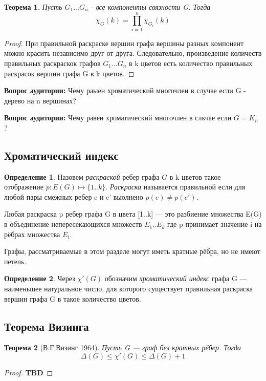 \documentclass{article}
\renewcommand{\le}{\leqslant}
\newtheorem{theorem}{Теорема}
\theoremstyle{definition}
\newtheorem{definition}{Определение}[section]
\newcommand{\question}{\textbf{Вопрос аудитории: }}
\theoremstyle{remark}
\begin{document}
\begin{theorem}
    Пусть $G_1...G_n$ - все компоненты связности G. Тогда 
    $$
    \chi_G(k) = \prod_{i = 1}^{n} \chi_{G_i}(k)
    $$
\end{theorem}
\begin{proof}
При правильной раскраске вершин графа вершины
разных компонент можно красить независимо друг от
друга. Следовательно, произведение количеств правильных
раскраскок графов $G_1...G_n$ в k цветов есть количество
правильных раскрасок вершин графа G в k цветов.
\end{proof}

\question Чему раыен хроматический многочлен в случае если  G - дерево на n вершинах?

\question Чему равен хроматический многочлен в слкчае если $G = K_n$ ? 

\subsection{Хроматический индекс}

\begin{definition}
    Назовем \textit{раскраской} ребер графа $G$ в k цветов такое отображение 
    $p: E(G) \mapsto \{1..k\}$. \textit{Раскраска} называется правильной если для любой пары смежных ребер e и e' выолнено $p(e) \not= p(e')$.
\end{definition}

Любая раскраска p ребер графа G в цвета [1..k] — это
разбиение множества E(G) в объединение
непересекающихся множеств $E_1..E_k$ где p принимает
значение i на рёбрах множества $E_i$.

Графы, рассматриваемые в этом разделе могут иметь
кратные рёбра, но не имеют петель.

\begin{definition}
    Через $\chi'(G)$ обозначим \textit{хроматический индекс} графа G — наименьшее натуральное число, для которого существует правильная раскраска вершин графа G в такое количество цветов.
\end{definition}

\subsection{Теорема Визинга}

\begin{theorem} [В.Г.Визинг 1964]
     Пусть G — граф без кратных рёбер. Тогда
     $$ \Delta(G) \le \chi'(G) \le \Delta(G) + 1$$
\end{theorem}
\begin{proof}
    \textbf{TBD}
\end{proof}
\end{document}
